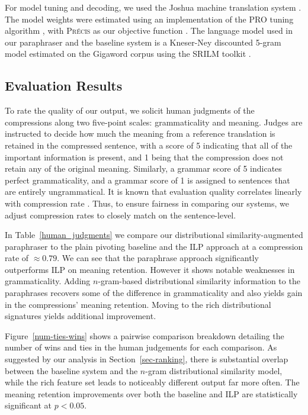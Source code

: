 \documentclass[11pt]{article}
\begin{document}
For model tuning and decoding, we used the Joshua machine translation
system \cite{Joshua-3.0}. The model weights were estimated using an
implementation of the PRO tuning algorithm \cite{PRO2011}, with
\textsc{Pr\'ecis} as our objective function \cite{Ganitkevitch2011}.  The
language model used in our paraphraser and the 
baseline system is a Kneser-Ney discounted 5-gram model estimated on
the Gigaword corpus using the SRILM toolkit \cite{SRILM}.

\subsection{Evaluation Results}

To rate the quality of our output, we solicit human judgments of the
compressions along two five-point scales: grammaticality and
meaning. Judges are instructed to decide how much the meaning from a
reference translation is retained in the compressed sentence, with a
score of 5 indicating that all of the important information is
present, and 1 being that the compression does not retain any of the
original meaning. Similarly, a grammar score of 5 indicates perfect
grammaticality, and a grammar score of 1 is assigned to sentences that
are entirely ungrammatical. It is known that evaluation quality
correlates linearly with compression rate \cite{Napoles2011}. Thus, to
ensure fairness in comparing our systems, we adjust compression rates
to closely match on the sentence-level.

In Table~\ref{human_judgments} we compare our distributional
similarity-augmented paraphraser to the plain pivoting baseline and
the ILP approach at a compression rate of $\approx 0.79$. We can see
that the paraphrase approach significantly outperforms ILP on meaning
retention. However it shows notable weaknesses in
grammaticality. Adding $n$-gram-based distributional similarity
information to the paraphrases recovers some of the difference in
grammaticality and also yields gain in the compressions' meaning
retention. Moving to the rich distributional signatures yields
additional improvement.

Figure~\ref{num-ties-wins} shows a pairwise comparison breakdown
detailing the number of wins and ties in the human judgements for each
comparison. As suggested by our analysis in Section~\ref{sec-ranking},
there is substantial overlap between the baseline system and the
$n$-gram distributional similarity model, while the rich feature set
leads to noticeably different output far more often. The meaning
retention improvements over both the baseline and ILP are
statistically significant at $p < 0.05$.
\end{document}
